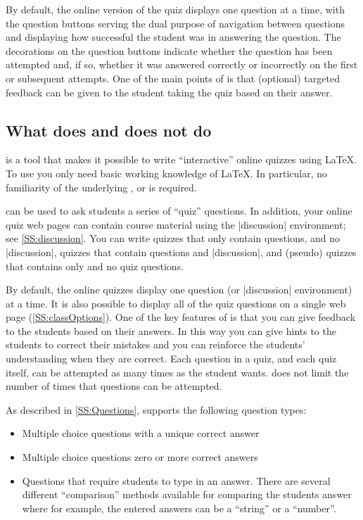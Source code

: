 \documentclass[svgnames]{article}
\begin{document}
      By default, the online version of the quiz displays one question at
      a time, with the question buttons serving the dual purpose of
      navigation between questions and displaying how successful the
      student was in answering the question. The decorations on the
      question buttons indicate whether the question has been attempted
      and, if so, whether it was answered correctly or incorrectly on the
      first or subsequent attempts. One of the main points of \WebQuiz is
      that (optional) targeted feedback can be given to the student taking
      the quiz based on their answer.

  \subsection{What \WebQuiz does and does not do}

      \WebQuiz is a tool that makes it possible to write ``interactive''
      online quizzes using \LaTeX{}. To use \WebQuiz you only need
      basic working knowledge of \LaTeX{}. In particular, no familiarity
      of the underlying \CSS, \HTML or \Javascript is required.

      \WebQuiz can be used to ask students a series of ``quiz''
      questions. In addition, your online quiz web pages can contain
      course material using the \WebQuiz \LatexCode|discussion|
      environment; see \autoref{SS:discussion}. You can write \WebQuiz
      quizzes that only contain questions, and no
      \LatexCode|discussion|, quizzes that contain questions and
      \LatexCode|discussion|, and (pseudo) quizzes that contains only
       and no quiz questions.

      By default, the online quizzes display one question (or
      \LatexCode|discussion| environment) at a time.  It is also possible
      to display all of the quiz questions on a single web page
      (\autoref{SS:classOptions}). One of the key features of \WebQuiz is
      that you can give feedback to the students based on their answers.
      In this way you can give hints to the students to correct their
      mistakes and you can reinforce the students' understanding when they
      are correct. Each question in a quiz, and each quiz itself, can be
      attempted as many times as the student wants. \WebQuiz does not
      limit the number of times that questions can be attempted.

      As described in \autoref{SS:Questions}, \WebQuiz  supports the following question types:
      \begin{itemize}
        \item Multiple choice questions with a unique correct answer
        \item Multiple choice questions zero or more correct answers
        \item Questions that require students to type in an answer. There
        are several different ``comparison'' methods available for
        comparing the students answer where
        for example, the entered answers can be a ``string'' or a ``number''.
      \end{itemize}
\end{document}

